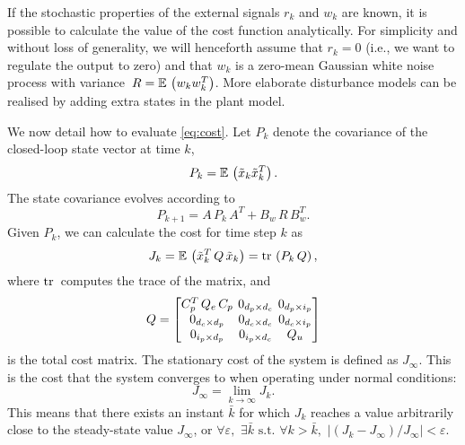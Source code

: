 If the stochastic properties of the external signals $r_k$ and $w_k$ are known, it is possible to calculate the value of the cost function analytically.
For simplicity and without loss of generality, we will henceforth assume that $r_k = 0$ (i.e., we want to regulate the output to zero) and that $w_k$ is a zero-mean Gaussian white noise process with variance~$R=\mathbb{E}\, \left(w_k w_k^T\right)$.
More elaborate disturbance models can be realised by adding extra states in the plant model.

We now detail how to evaluate \eqref{eq:cost}.
Let $P_k$ denote the covariance of the closed-loop state vector at time $k$,
%
\begin{equation}
\label{eq:covarcalc}
    P_k = \mathbb{E}\, \left( \tilde x_k \tilde x_k^T \right).
\end{equation}
%
The state covariance evolves according to
%
\begin{equation}
\label{eq:covevolution}
    P_{k+1} = A \,P_k\, A^T + B_w \,R\, B_w^T.
\end{equation}
%
Given $P_k$, we can calculate the cost for time step $k$ as
%
\begin{equation}
\label{eq:covartocost}
    J_k = \mathbb{E}\, \left(\tilde x_k^T \,Q\, \tilde x_k \right)= \mathrm{tr}\, \left(P_k \,Q\right),
\end{equation}
%
where $\mathrm{tr}\,$ computes the trace of the matrix, and
%
\begin{equation}
    \setlength\arraycolsep{2pt}
    Q = \begin{bmatrix} 
        C_p^T\,Q_e\,C_p                           & 0_{\numstatesplant \times \numstatesctl} & 0_{\numstatesplant \times \numinputplant} \\
        0_{\numstatesctl \times \numstatesplant}  & 0_{\numstatesctl \times \numstatesctl}   & 0_{\numstatesctl \times \numinputplant} \\
        0_{\numinputplant \times \numstatesplant} & 0_{\numinputplant \times \numstatesctl}  & Q_u
    \end{bmatrix} 
\end{equation}
%
is the total cost matrix.
The stationary cost of the system is defined as $J_\infty$.
This is the cost that the system converges to when operating under normal conditions:
%
\begin{equation}
    J_\infty = \lim_{k\rightarrow\infty} J_k.
\end{equation}
%
This means that there exists an instant $\bar{k}$ for which $J_k$ reaches a value arbitrarily close to the steady-state value $J_\infty$, or $\forall \varepsilon, \,\, \exists \bar{k} \text{~s.t.~} \forall k>\bar{k},\,\,|(J_k - J_\infty)/J_\infty| < \varepsilon$.
